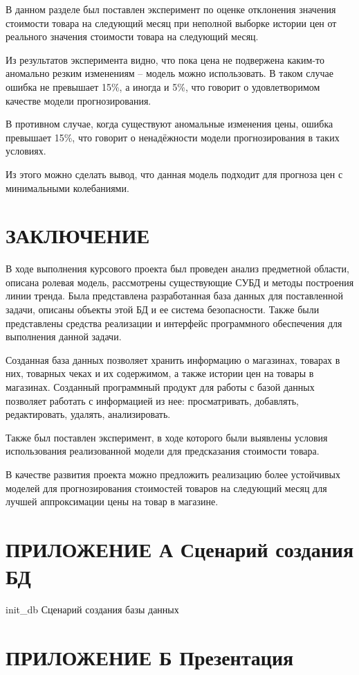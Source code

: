 \documentclass{bmstu}
\begin{document}
В данном разделе был поставлен эксперимент по оценке отклонения значения стоимости товара на следующий месяц при неполной выборке истории цен от реального значения стоимости товара на следующий месяц.

Из результатов эксперимента видно, что пока цена не подвержена каким-то аномально резким изменениям -- модель можно использовать. В таком случае ошибка не превышает 15\%, а иногда и 5\%, что говорит о удовлетворимом качестве модели прогнозирования. 

В противном случае, когда существуют аномальные изменения цены, ошибка превышает 15\%, что говорит о ненадёжности модели прогнозирования в таких условиях.

Из этого можно сделать вывод, что данная модель подходит для прогноза цен с минимальными колебаниями.


\chapter*{ЗАКЛЮЧЕНИЕ}

В ходе выполнения курсового проекта был проведен анализ предметной области, описана ролевая модель, рассмотрены существующие СУБД и методы построения линии тренда. Была представлена разработанная база данных для поставленной задачи, описаны объекты этой БД и ее система безопасности. Также были представлены средства реализации и интерфейс программного обеспечения для выполнения данной задачи.

Созданная база данных позволяет хранить информацию о магазинах, товарах в них, товарных чеках и их содержимом, а также истории цен на товары в магазинах. Созданный программный продукт для работы с базой данных позволяет работать с информацией из нее: просматривать, добавлять, редактировать, удалять, анализировать.

Также был поставлен эксперимент, в ходе которого были выявлены условия использования реализованной модели для предсказания стоимости товара.

В качестве развития проекта можно предложить реализацию более устойчивых моделей для прогнозирования стоимостей товаров на следующий месяц для лучшей аппроксимации цены на товар в магазине. 

\makebibliography

\chapter*{ПРИЛОЖЕНИЕ А Сценарий создания БД}

	{init_db}
	{Сценарий создания базы данных}

\chapter*{ПРИЛОЖЕНИЕ Б Презентация}
\end{document}
